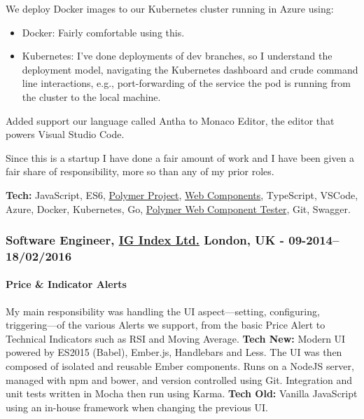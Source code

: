 \documentclass[
  a4paper,
  8pt,
]{article}
\providecommand{\tightlist}{%
  \setlength{\itemsep}{0pt}\setlength{\parskip}{0pt}}
\begin{document}
\begin{multicols}{2}
We deploy Docker images to our Kubernetes cluster running in Azure
using:

\begin{itemize}
\tightlist
\item
  Docker: Fairly comfortable using this.
\item
  Kubernetes: I've done deployments of dev branches, so I understand the
  deployment model, navigating the Kubernetes dashboard and crude
  command line interactions, e.g., port-forwarding of the service the
  pod is running from the cluster to the local machine.
\end{itemize}

Added support our language called Antha to Monaco Editor, the editor
that powers Visual Studio Code.

Since this is a startup I have done a fair amount of work and I have
been given a fair share of responsibility, more so than any of my prior
roles.

\textbf{Tech:} JavaScript, ES6,
\href{https://www.polymer-project.org}{Polymer Project},
\href{https://www.webcomponents.org}{Web Components}, TypeScript,
VSCode, Azure, Docker, Kubernetes, Go,
\href{https://github.com/Polymer/web-component-tester}{Polymer Web
Component Tester}, Git, Swagger.

\hypertarget{software-engineer-ig-index-ltd.-london-uk---09-201418022016}{%
\subsubsection{\texorpdfstring{Software Engineer,
\href{https://www.ig.com/uk}{IG Index Ltd.} London, UK -
09-2014--18/02/2016}{Software Engineer, IG Index Ltd. London, UK - 09-2014--18/02/2016}}\label{software-engineer-ig-index-ltd.-london-uk---09-201418022016}}

\hypertarget{price-indicator-alerts}{%
\paragraph{Price \& Indicator Alerts}\label{price-indicator-alerts}}

My main responsibility was handling the UI aspect---setting,
configuring, triggering---of the various Alerts we support, from the
basic Price Alert to Technical Indicators such as RSI and Moving
Average. \textbf{Tech New:} Modern UI powered by ES2015 (Babel),
Ember.js, Handlebars and Less. The UI was then composed of isolated and
reusable Ember components. Runs on a NodeJS server, managed with npm and
bower, and version controlled using Git. Integration and unit tests
written in Mocha then run using Karma. \textbf{Tech Old:} Vanilla
JavaScript using an in-house framework when changing the previous UI.


\end{multicols}
\end{document}
